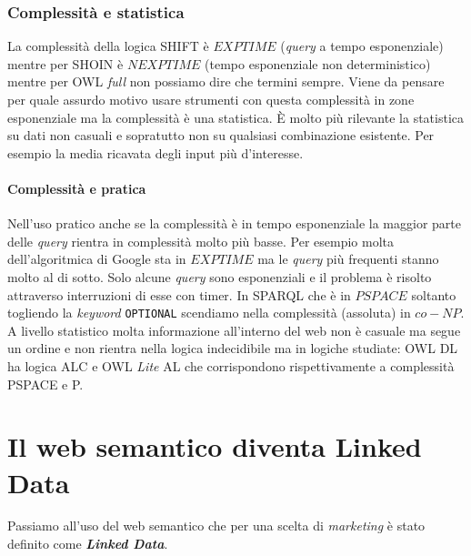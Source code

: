 			\subsubsection{Complessità e statistica}	
				La complessità della logica SHIFT è $EXPTIME$ (\emph{query} a tempo esponenziale) mentre per SHOIN è $NEXPTIME$ (tempo esponenziale non deterministico) mentre per OWL \emph{full} non possiamo dire che termini sempre. Viene da pensare per quale assurdo motivo usare strumenti con questa complessità in zone esponenziale ma la complessità è una statistica. È molto più rilevante la statistica su dati non casuali e sopratutto non su qualsiasi combinazione esistente. Per esempio la media ricavata degli input più d'interesse.
					
				\paragraph*{Complessità e pratica} Nell'uso pratico anche se la complessità è in tempo esponenziale la maggior parte delle \emph{query} rientra in complessità molto più basse. Per esempio molta dell'algoritmica di Google sta in $EXPTIME$ ma le \emph{query} più frequenti stanno molto al di sotto. Solo alcune \emph{query} sono esponenziali e il problema è risolto attraverso interruzioni di esse con timer. 
				In SPARQL che è in $PSPACE$ soltanto togliendo la \emph{keyword} \verb|OPTIONAL| scendiamo nella complessità (assoluta) in $co-NP$. A livello statistico molta informazione all'interno del web non è casuale ma segue un ordine e non rientra nella logica indecidibile ma in logiche studiate: OWL DL ha logica ALC e OWL \emph{Lite} AL che corrispondono rispettivamente a complessità PSPACE e P.				
		
	\section{Il web semantico diventa Linked Data}
		Passiamo all'uso del web semantico che per una scelta di \emph{marketing} è stato definito come \textbf{\emph{Linked Data}}.
		
